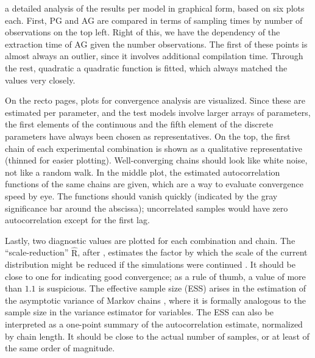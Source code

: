  a detailed analysis of the results per model in graphical form, based on six
plots each.  First, PG and AG are compared in terms of sampling times by number of observations on
the top left.  Right of this, we have the dependency of the extraction time of AG given the number
observations.  The first of these points is almost always an outlier, since it involves additional
compilation time.  Through the rest, quadratic a quadratic function is fitted, which always matched
the values very closely.

On the recto pages, plots for convergence analysis are visualized.  Since these are estimated per
parameter, and the test models involve larger arrays of parameters, the first elements of the
continuous and the fifth element of the discrete parameters have always been chosen as
representatives.  On the top, the first chain of each experimental combination is shown as a
qualitative representative (thinned for easier plotting).  Well-converging chains should look like
white noise, not like a random walk.  In the middle plot, the estimated autocorrelation functions of
the same chains are given, which are a way to evaluate convergence speed by eye.  The functions
should vanish quickly (indicated by the gray significance bar around the abscissa); uncorrelated
samples would have zero autocorrelation except for the first lag.

Lastly, two diagnostic values are plotted for each combination and chain.  The
\enquote{scale-reduction} \(\widehat{\mathrm{R}}\), after \textcite{gelman1992inference}, estimates
the factor by which the scale of the current distribution might be reduced if the simulations were
continued \parencite[see][p. 285]{gelman2020bayesian}.  It should be close to one for indicating
good convergence; as a rule of thumb, a value of more than \(1.1\) is suspicious.  The effective
sample size (ESS) arises in the estimation of the asymptotic variance of Markov chains
\parencite[][section 7.2]{vihola2020lectures}, where it is formally analogous to the sample size in
the variance estimator for \iid{} variables.  The ESS can also be interpreted as a one-point summary
of the autocorrelation estimate, normalized by chain length.  It should be close to the actual
number of samples, or at least of the same order of magnitude.


